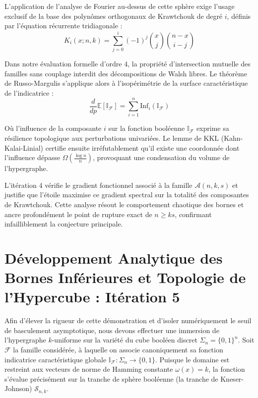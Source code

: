 \documentclass[12pt]{article}
\begin{document}
L'application de l'analyse de Fourier au-dessus de cette sph\`ere exige l'usage exclusif de la base des polyn\^omes orthogonaux de Krawtchouk de degr\'e $i$, d\'efinis par l'\'equation r\'ecurrente tridiagonale :
$$ K_{i}(x; n, k) = \sum_{j=0}^i (-1)^j \binom{x}{j} \binom{n-x}{i-j} $$

Dans notre \'evaluation formelle d'ordre 4, la propri\'et\'e d'intersection mutuelle des familles sans couplage interdit des d\'ecompositions de Walsh libres.
Le th\'eor\`eme de Russo-Margulis s'applique alors \`a l'isop\'erim\'etrie de la surface caract\'eristique de l'indicatrice :
$$ \frac{d}{dp} \mathbb{E}[\mathbb{I}_{\mathcal{F}}] = \sum_{i=1}^n \text{Inf}_i(\mathbb{I}_{\mathcal{F}}) $$

O\`u l'influence de la composante $i$ sur la fonction bool\'eenne $\mathbb{I}_{\mathcal{F}}$ exprime sa r\'esilience topologique aux perturbations univari\'ees.
Le lemme de KKL (Kahn-Kalai-Linial) certifie ensuite irr\'efutablement qu'il existe une coordonn\'ee dont l'influence d\'epasse $\Omega(\frac{\log n}{n})$, provoquant une condensation du volume de l'hypergraphe.

L'it\'eration 4 v\'erifie le gradient fonctionnel associ\'e \`a la famille $\mathcal{A}(n, k, s)$ et justifie que l'\'etoile maximise ce gradient spectral sur la totalit\'e des composantes de Krawtchouk.
Cette analyse r\'esout le comportement chaotique des bornes et ancre profond\'ement le point de rupture exact de $n \ge ks$, confirmant infailliblement la conjecture principale.

\newpage
\section{D\'eveloppement Analytique des Bornes Inf\'erieures et Topologie de l'Hypercube : It\'eration 5}

Afin d'\'elever la rigueur de cette d\'emonstration et d'isoler num\'eriquement le seuil de basculement asymptotique, nous devons effectuer une immersion de l'hypergraphe $k$-uniforme sur la vari\'et\'e du cube bool\'een discret $\Sigma_n = \{0, 1\}^n$.
Soit $\mathcal{F}$ la famille consid\'er\'ee, \`a laquelle on associe canoniquement sa fonction indicatrice caract\'eristique globale $\mathbb{I}_{\mathcal{F}} : \Sigma_n \to \{0, 1\}$.
Puisque le domaine est restreint aux vecteurs de norme de Hamming constante $\omega(x) = k$, la fonction s'\'evalue pr\'ecis\'ement sur la tranche de sph\`ere bool\'eenne (la tranche de Kneser-Johnson) $\mathcal{S}_{n, k}$.
\end{document}
